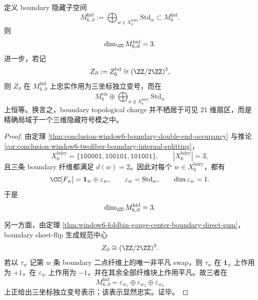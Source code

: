 \begin{proposition}\label{prop:conclusion-window6-boundary-hidden-sign-module}
定义 boundary 隐藏子空间
\[
M_{6,\partial}^{\mathrm{hid}}
:=
\bigoplus_{w\in X_6^{\mathrm{bdry}}}\mathrm{Std}_w
\subset M_6^{\mathrm{hid}}.
\]
则
\[
\dim_{\CC}M_{6,\partial}^{\mathrm{hid}}=3.
\]
进一步，若记
\[
Z_{\partial}:=Z_6^{\mathrm{bd}}\cong (\ZZ/2\ZZ)^3,
\]
则 \(Z_{\partial}\) 在 \(M_{6,\partial}^{\mathrm{hid}}\) 上忠实作用为三坐标独立变号，而在
\[
M_6^{\mathrm{vis}}\oplus \bigoplus_{w\notin X_6^{\mathrm{bdry}}}\mathrm{Std}_w
\]
上恒等。换言之，boundary topological charge 并不栖居于可见 \(21\) 维扇区，而是精确局域于一个三维隐藏符号模之中。
\end{proposition}
\begin{proof}
由定理 \ref{thm:conclusion-window6-boundary-double-end-occupancy} 与推论 \ref{cor:conclusion-window6-twofiber-boundary-internal-splitting}，
\[
X_6^{\mathrm{bdry}}=\{\texttt{100001},\texttt{100101},\texttt{101001}\},
\qquad
|X_6^{\mathrm{bdry}}|=3,
\]
且三条 boundary 纤维都满足 \(d(w)=2\)。因此对每个 \(w\in X_6^{\mathrm{bdry}}\)，都有
\[
\CC[F_w]=\mathbf 1_w\oplus \varepsilon_w,
\qquad
\varepsilon_w=\mathrm{Std}_w,
\qquad
\dim \varepsilon_w=1.
\]
于是
\[
\dim_{\CC}M_{6,\partial}^{\mathrm{hid}}=3.
\]

另一方面，由定理 \ref{thm:window6-foldbin-gauge-center-boundary-direct-sum}，boundary sheet-flip 生成规范中心
\[
Z_{\partial}\cong (\ZZ/2\ZZ)^3.
\]
若以 \(\tau_w\) 记第 \(w\) 条 boundary 二点纤维上的唯一非平凡 swap，则 \(\tau_w\) 在 \(\mathbf 1_w\) 上作用为 \(+1\)，在 \(\varepsilon_w\) 上作用为 \(-1\)，并在其余全部纤维块上作用平凡。故三者在
\[
M_{6,\partial}^{\mathrm{hid}}=\varepsilon_{w_1}\oplus \varepsilon_{w_2}\oplus \varepsilon_{w_3}
\]
上正给出三坐标独立变号表示；该表示显然忠实。证毕。
\end{proof}

